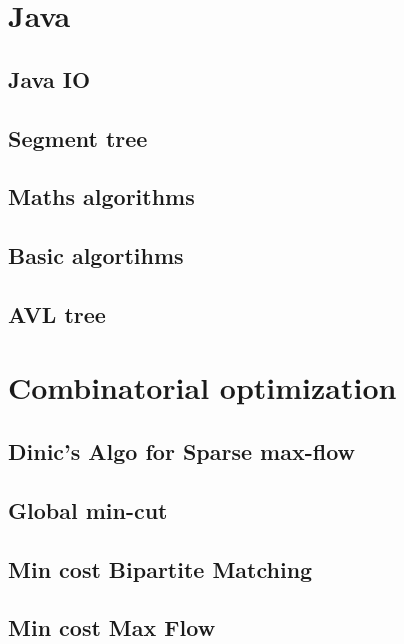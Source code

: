 \section{Java}
\subsection{Java IO}
\raggedbottom
\hrulefill
\subsection{Segment tree}
\raggedbottom
\hrulefill
\subsection{ Maths algorithms}
\raggedbottom
\hrulefill
\subsection{ Basic algortihms}
\raggedbottom
\hrulefill
\subsection{AVL tree}
\raggedbottom
\hrulefill

\section{Combinatorial optimization}
\subsection{Dinic's Algo for Sparse max-flow}
\raggedbottom
\hrulefill
\subsection{Global min-cut}
\raggedbottom
\hrulefill
\subsection{Min cost Bipartite Matching}
\raggedbottom
\hrulefill
\subsection{Min cost Max Flow}
\raggedbottom
\hrulefill

